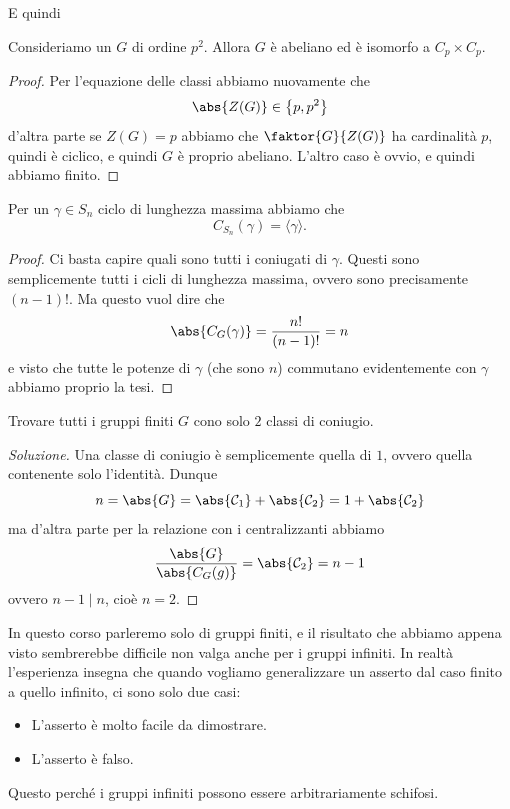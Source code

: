\documentclass[11pt]{scrartcl}
\begin{document}
	 E quindi
	 \begin{proposition}
	 	Consideriamo un $G$ di ordine $p^2$. Allora $G$ è abeliano ed è isomorfo a $C_p\times C_p$.
	 \end{proposition}
	 \begin{proof}
	 	Per l'equazione delle classi abbiamo nuovamente che
	 	$$\abs{Z(G)}\in \left\{p,p^2\right\}$$
	 	d'altra parte se $Z(G)=p$ abbiamo che $\faktor{G}{Z(G)}$ ha cardinalità $p$, quindi è ciclico, e quindi $G$ è proprio abeliano. L'altro caso è ovvio, e quindi abbiamo finito.
	 \end{proof}
	 \begin{proposition}
	 	Per un $\gamma\in S_n$ ciclo di lunghezza massima abbiamo che
	 	$$C_{S_n}(\gamma)=\langle \gamma \rangle.$$
	 \end{proposition}
	 \begin{proof}
	 	Ci basta capire quali sono tutti i coniugati di $\gamma$. Questi sono semplicemente tutti i cicli di lunghezza massima, ovvero sono precisamente $(n-1)!$. Ma questo vuol dire che 
	 	$$\abs{C_G(\gamma)}=\frac{n!}{(n-1)!}=n$$
	 	e visto che tutte le potenze di $\gamma$ (che sono $n$) commutano evidentemente con $\gamma$ abbiamo proprio la tesi.
	 \end{proof}
	 \begin{exercise}
	 	Trovare tutti i gruppi finiti $G$ cono solo $2$ classi di coniugio.
	 \end{exercise}
	 \begin{proof}[Soluzione]
	 	Una classe di coniugio è semplicemente quella di $1$, ovvero quella contenente solo l'identità. Dunque
	 	$$n=\abs{G}=\abs{\mathcal{C}_1}+\abs{\mathcal{C}_2}=1+\abs{\mathcal{C}_2}$$
	 	ma d'altra parte per la relazione con i centralizzanti abbiamo
	 	$$\frac{\abs{G}}{\abs{C_G(g)}}=\abs{\mathcal{C}_2}=n-1$$
	 	ovvero $n-1\mid n$, cioè $n=2$.
	 \end{proof}
	 In questo corso parleremo solo di gruppi finiti, e il risultato che abbiamo appena visto sembrerebbe difficile non valga anche per i gruppi infiniti. In realtà l'esperienza insegna che quando vogliamo generalizzare un asserto dal caso finito a quello infinito, ci sono solo due casi:
	 \begin{itemize}
	 	\item L'asserto è molto facile da dimostrare.
	 	\item L'asserto è falso.
	 \end{itemize}
	 Questo perché i gruppi infiniti possono essere arbitrariamente schifosi.
\end{document}
